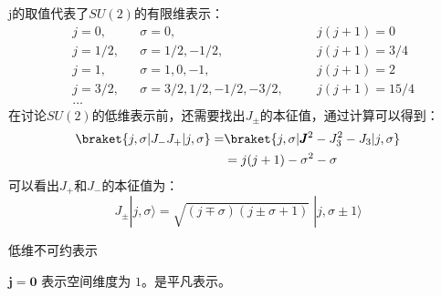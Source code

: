 j的取值代表了$SU(2)$的有限维表示：
\begin{align}
& j = 0,   && \sigma = 0,                        && j(j+1) = 0 \nonumber \\
& j = 1/2, && \sigma = 1/2, -1/2,                && j(j+1) = 3/4 \nonumber \\
& j = 1,   && \sigma = 1, 0, -1,                 && j(j+1) = 2 \nonumber \\
& j = 3/2, && \sigma = 3/2, 1/2, -1/2, -3/2, \quad && j(j+1) = 15/4 \nonumber \\
& \dots    &&                               && 
\end{align}
在讨论$SU(2)$的低维表示前，还需要找出$J_\pm$的本征值，通过计算可以得到：
\begin{equation}
    \begin{aligned}
        \braket{j,\sigma|J_-J_+|j,\sigma}=&\braket{j,\sigma|\pmb{J}^2 - J_3^2 - J_3|j,\sigma}\\
        &= j(j+1) - \sigma^2 - \sigma
    \end{aligned}
\end{equation}
可以看出$J_+$和$J_-$的本征值为：    
\begin{equation}
    J_{\pm}|j,\sigma\rangle = \sqrt{(j \mp \sigma)(j \pm \sigma + 1)}\;|j,\sigma \pm 1\rangle
\end{equation}


\begin{center}\vspace{2ex}
\large 低维不可约表示
\vspace{2ex}\end{center}
$\mathbf{j=0}$ 表示空间维度为 $1$。是平凡表示。
\vspace{2ex}

